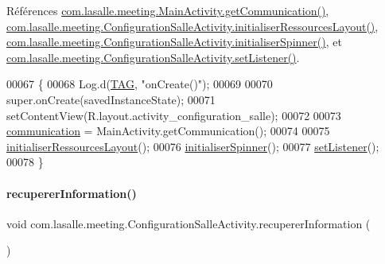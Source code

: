 Références \hyperlink{_main_activity_8java_source_l00479}{com.\+lasalle.\+meeting.\+Main\+Activity.\+get\+Communication()}, \hyperlink{_configuration_salle_activity_8java_source_l00084}{com.\+lasalle.\+meeting.\+Configuration\+Salle\+Activity.\+initialiser\+Ressources\+Layout()}, \hyperlink{_configuration_salle_activity_8java_source_l00100}{com.\+lasalle.\+meeting.\+Configuration\+Salle\+Activity.\+initialiser\+Spinner()}, et \hyperlink{_configuration_salle_activity_8java_source_l00138}{com.\+lasalle.\+meeting.\+Configuration\+Salle\+Activity.\+set\+Listener()}.


\begin{DoxyCode}
00067     \{
00068         Log.d(\hyperlink{classcom_1_1lasalle_1_1meeting_1_1_configuration_salle_activity_a55224a88c619aa44eb96c0febc3f1857}{TAG}, \textcolor{stringliteral}{"onCreate()"});
00069 
00070         super.onCreate(savedInstanceState);
00071         setContentView(R.layout.activity\_configuration\_salle);
00072 
00073         \hyperlink{classcom_1_1lasalle_1_1meeting_1_1_configuration_salle_activity_a8ad9ee754954c8bc7d9c3f8313e48a2c}{communication} = MainActivity.getCommunication();
00074 
00075         \hyperlink{classcom_1_1lasalle_1_1meeting_1_1_configuration_salle_activity_a24314b86f87df50bb933484d1d1435ac}{initialiserRessourcesLayout}();
00076         \hyperlink{classcom_1_1lasalle_1_1meeting_1_1_configuration_salle_activity_ac0b88ac36a5ee40988f3ee8fea7c54ee}{initialiserSpinner}();
00077         \hyperlink{classcom_1_1lasalle_1_1meeting_1_1_configuration_salle_activity_a8d3eea01718b9535c88caa796d8b6377}{setListener}();
00078     \}
\end{DoxyCode}
\mbox{\label{classcom_1_1lasalle_1_1meeting_1_1_configuration_salle_activity_a6c5c3c9c513b13eb9182573732d392f5}} 
\paragraph{\texorpdfstring{recuperer\+Information()}{recupererInformation()}}
{\footnotesize\ttfamily void com.\+lasalle.\+meeting.\+Configuration\+Salle\+Activity.\+recuperer\+Information (\begin{DoxyParamCaption}{ }\end{DoxyParamCaption})}



